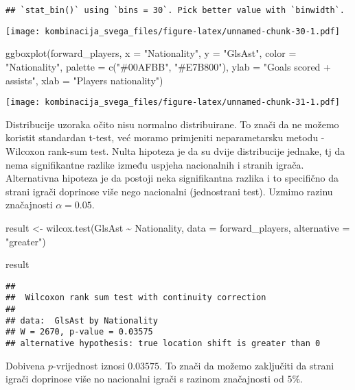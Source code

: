 \documentclass[
]{article}
\newenvironment{Shaded}{\begin{snugshade}}{\end{snugshade}}
\newcommand{\AttributeTok}[1]{\textcolor[rgb]{0.77,0.63,0.00}{#1}}
\newcommand{\FunctionTok}[1]{\textcolor[rgb]{0.00,0.00,0.00}{#1}}
\newcommand{\NormalTok}[1]{#1}
\newcommand{\OtherTok}[1]{\textcolor[rgb]{0.56,0.35,0.01}{#1}}
\newcommand{\SpecialCharTok}[1]{\textcolor[rgb]{0.00,0.00,0.00}{#1}}
\newcommand{\StringTok}[1]{\textcolor[rgb]{0.31,0.60,0.02}{#1}}
\begin{document}
\begin{verbatim}
## `stat_bin()` using `bins = 30`. Pick better value with `binwidth`.
\end{verbatim}

\texttt{[image: kombinacija\_svega\_files/figure-latex/unnamed-chunk-30-1.pdf]}

\begin{Shaded}
\begin{Highlighting}[]
\FunctionTok{ggboxplot}\NormalTok{(forward\_players, }\AttributeTok{x =} \StringTok{"Nationality"}\NormalTok{, }\AttributeTok{y =} \StringTok{"GlsAst"}\NormalTok{, }
          \AttributeTok{color =} \StringTok{"Nationality"}\NormalTok{, }\AttributeTok{palette =} \FunctionTok{c}\NormalTok{(}\StringTok{"\#00AFBB"}\NormalTok{, }\StringTok{"\#E7B800"}\NormalTok{),}
          \AttributeTok{ylab =} \StringTok{"Goals scored + assists"}\NormalTok{, }\AttributeTok{xlab =} \StringTok{"Player\textquotesingle{}s nationality"}\NormalTok{)}
\end{Highlighting}
\end{Shaded}

\texttt{[image: kombinacija\_svega\_files/figure-latex/unnamed-chunk-31-1.pdf]}

Distribucije uzoraka očito nisu normalno distribuirane. To znači da ne
možemo koristit standardan t-test, već moramo primjeniti neparametarsku
metodu - Wilcoxon rank-sum test. Nulta hipoteza je da su dvije
distribucije jednake, tj da nema signifikantne razlike između uspjeha
nacionalnih i stranih igrača. Alternativna hipoteza je da postoji neka
signifikantna razlika i to specifično da strani igrači doprinose više
nego nacionalni (jednostrani test). Uzmimo razinu značajnosti
\(\alpha = 0.05\).

\begin{Shaded}
\begin{Highlighting}[]
\NormalTok{result }\OtherTok{\textless{}{-}} \FunctionTok{wilcox.test}\NormalTok{(GlsAst }\SpecialCharTok{\textasciitilde{}}\NormalTok{ Nationality, }\AttributeTok{data =}\NormalTok{ forward\_players, }\AttributeTok{alternative =} \StringTok{"greater"}\NormalTok{)}

\NormalTok{result}
\end{Highlighting}
\end{Shaded}

\begin{verbatim}
## 
##  Wilcoxon rank sum test with continuity correction
## 
## data:  GlsAst by Nationality
## W = 2670, p-value = 0.03575
## alternative hypothesis: true location shift is greater than 0
\end{verbatim}

Dobivena \(p\)-vrijednost iznosi \(0.03575\). To znači da možemo
zaključiti da strani igrači doprinose više no nacionalni igrači s
razinom značajnosti od \(5\%\).
\end{document}
